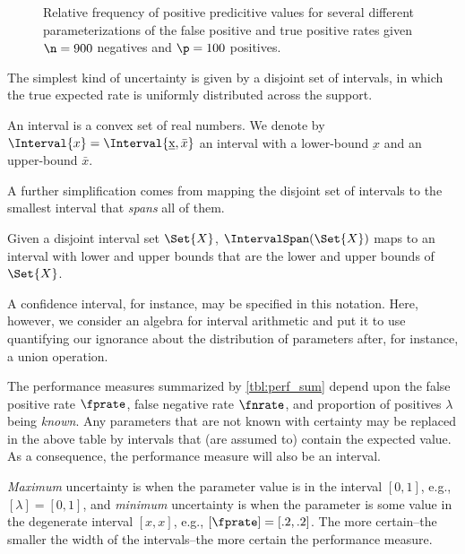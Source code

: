 \documentclass[ ../main.tex]{subfiles}
\begin{document}
\begin{figure}
	\def\svgwidth{\columnwidth}
	\centering
	\captionsetup{justification=centering}
	\caption
	{
		Relative frequency of positive predicitive values for several different parameterizations of the false positive and true positive rates given $\n = 900$ negatives and $\p=100$ positives.
	}    
	
	\label{fig:mixnorm}
\end{figure}

The simplest kind of uncertainty is given by a disjoint set of intervals, in which the true expected rate is uniformly distributed across the support.
\begin{definition}
An interval is a convex set of real numbers. We denote by $\Interval{x} = \Interval{\underbar{x},\bar{x}}$ an interval with a lower-bound $\underbar{x}$ and an upper-bound $\bar{x}$.
\end{definition}

A further simplification comes from mapping the disjoint set of intervals to the smallest interval that \emph{spans} all of them.
\begin{definition}
Given a disjoint interval set $\Set{X}$, $\IntervalSpan(\Set{X})$ maps to an interval with lower and upper bounds that are the lower and upper bounds of $\Set{X}$.
\end{definition}




A confidence interval, for instance, may be specified in this notation.
Here, however, we consider an algebra for interval arithmetic and put it to use quantifying our ignorance about the distribution of parameters after, for instance, a union operation.

The performance measures summarized by \cref{tbl:perf_sum} depend upon the false positive rate $\fprate$, false negative rate $\fnrate$, and proportion of positives $\lambda$ being \emph{known}.
Any parameters that are not known with certainty may be replaced in the above table by intervals that (are assumed to) contain the expected value.
As a consequence, the performance measure will also be an interval.

\emph{Maximum} uncertainty is when the parameter value is in the interval $[0,1]$, e.g., $[\lambda] = [0,1]$, and \emph{minimum} uncertainty is when the parameter is some value in the degenerate interval $[x,x]$, e.g., $[\fprate] = [.2,.2]$. The more certain--the smaller the width of the intervals--the more certain the performance measure.
\end{document}
